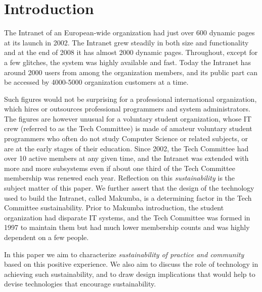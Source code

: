\documentclass{acm_proc_article-sp}
\begin{document}



\section{Introduction}\label{sec:introduction}
The Intranet of an European-wide organization had just over 600 dynamic pages at its launch in 2002. The Intranet grew steadily in both size and functionality and at the end of 2008 it has almost 2000 dynamic pages. Throughout, except for a few glitches, the system was highly available and fast. Today the Intranet has around 2000 users from among the organization members, and its public part can be accessed by 4000-5000 organization customers at a time.

Such figures would not be surprising for a professional international organization, which hires or outsources professional programmers and system administrators. 
The figures are however unusual for a voluntary student organization, whose IT crew (referred to as the Tech Committee) is made of amateur voluntary student programmers who often do not study Computer Science or related subjects, or are at the early stages of their education.  
Since 2002, the Tech Committee had over 10 active members at any given time, and the Intranet was extended with more and more subsystems even if about one third of the Tech Committee membership was renewed each year. Reflection on this {\it sustainability} is the subject matter of this paper. We further assert that the design of the technology used to build the Intranet, called Makumba, is a determining factor in the Tech Committee sustainability.
Prior to Makumba introduction, the student organization had disparate IT systems, and the Tech Committee was formed in 1997 to maintain them but had much lower membership counts and was highly dependent on a few people.

In this paper we aim to characterize {\it sustainability of practice and community} based on this positive experience. We also aim to discuss the role of technology in achieving such sustainability, and to draw design implications that would help to devise technologies that encourage sustainability. 
\end{document}

